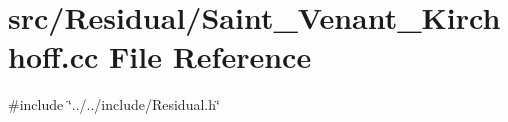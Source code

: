 \section{src/\+Residual/\+Saint\+\_\+\+Venant\+\_\+\+Kirchhoff.cc File Reference}
\label{_saint___venant___kirchhoff_8cc}
{\ttfamily \#include \char`\"{}../../include/\+Residual.\+h\char`\"{}}\newline
